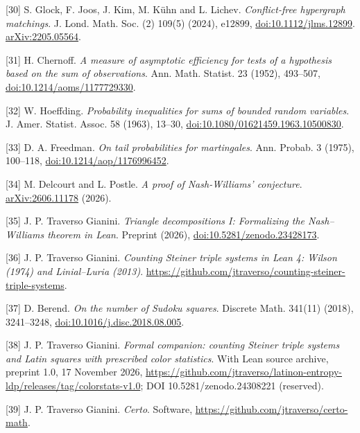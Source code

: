 \documentclass[spanish,11pt,a4paper]{article}
\begin{document}
{[}30{]} S. Glock, F. Joos, J. Kim, M. Kühn and L. Lichev. \emph{Conflict-free hypergraph matchings}. J. Lond. Math. Soc. (2) 109(5) (2024), e12899, \href{https://doi.org/10.1112/jlms.12899}{doi:10.1112/jlms.12899}. \href{https://arxiv.org/abs/2205.05564}{arXiv:2205.05564}.

{[}31{]} H. Chernoff. \emph{A measure of asymptotic efficiency for tests of a hypothesis based on the sum of observations}. Ann. Math. Statist. 23 (1952), 493--507, \href{https://doi.org/10.1214/aoms/1177729330}{doi:10.1214/aoms/1177729330}.

{[}32{]} W. Hoeffding. \emph{Probability inequalities for sums of bounded random variables}. J. Amer. Statist. Assoc. 58 (1963), 13--30, \href{https://doi.org/10.1080/01621459.1963.10500830}{doi:10.1080/01621459.1963.10500830}.

{[}33{]} D. A. Freedman. \emph{On tail probabilities for martingales}. Ann. Probab. 3 (1975), 100--118, \href{https://doi.org/10.1214/aop/1176996452}{doi:10.1214/aop/1176996452}.

{[}34{]} M. Delcourt and L. Postle. \emph{A proof of Nash-Williams' conjecture}. \href{https://arxiv.org/abs/2606.11178}{arXiv:2606.11178} (2026).

{[}35{]} J. P. Traverso Gianini. \emph{Triangle decompositions I: Formalizing the Nash--Williams theorem in Lean}. Preprint (2026), \href{https://doi.org/10.5281/zenodo.23428173}{doi:10.5281/zenodo.23428173}.

{[}36{]} J. P. Traverso Gianini. \emph{Counting Steiner triple systems in Lean 4: Wilson (1974) and Linial--Luria (2013)}. \url{https://github.com/jtraverso/counting-steiner-triple-systems}.

{[}37{]} D. Berend. \emph{On the number of Sudoku squares}. Discrete Math. 341(11) (2018), 3241--3248, \href{https://doi.org/10.1016/j.disc.2018.08.005}{doi:10.1016/j.disc.2018.08.005}.

{[}38{]} J. P. Traverso Gianini. \emph{Formal companion: counting Steiner triple systems and Latin squares with prescribed color statistics}. With Lean source archive, preprint 1.0, 17 November 2026, \url{https://github.com/jtraverso/latinon-entropy-ldp/releases/tag/colorstats-v1.0}; DOI 10.5281/zenodo.24308221 (reserved).

{[}39{]} J. P. Traverso Gianini. \emph{Certo}. Software, \url{https://github.com/jtraverso/certo-math}.

\endgroup
\end{document}
